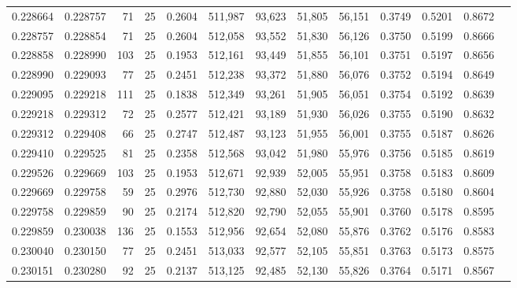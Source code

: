 \begin{tabular}{rrrrrrrrrrrrr}
0.228664 & 0.228757 &    71 &  25 &                                     0.2604 & 511,987 &  93,623 &  51,805 &  56,151 & 0.3749 & 0.5201 & 0.8672 \\
0.228757 & 0.228854 &    71 &  25 &                                     0.2604 & 512,058 &  93,552 &  51,830 &  56,126 & 0.3750 & 0.5199 & 0.8666 \\
0.228858 & 0.228990 &   103 &  25 &                                     0.1953 & 512,161 &  93,449 &  51,855 &  56,101 & 0.3751 & 0.5197 & 0.8656 \\
0.228990 & 0.229093 &    77 &  25 &                                     0.2451 & 512,238 &  93,372 &  51,880 &  56,076 & 0.3752 & 0.5194 & 0.8649 \\
0.229095 & 0.229218 &   111 &  25 &                                     0.1838 & 512,349 &  93,261 &  51,905 &  56,051 & 0.3754 & 0.5192 & 0.8639 \\
0.229218 & 0.229312 &    72 &  25 &                                     0.2577 & 512,421 &  93,189 &  51,930 &  56,026 & 0.3755 & 0.5190 & 0.8632 \\
0.229312 & 0.229408 &    66 &  25 &                                     0.2747 & 512,487 &  93,123 &  51,955 &  56,001 & 0.3755 & 0.5187 & 0.8626 \\
0.229410 & 0.229525 &    81 &  25 &                                     0.2358 & 512,568 &  93,042 &  51,980 &  55,976 & 0.3756 & 0.5185 & 0.8619 \\
0.229526 & 0.229669 &   103 &  25 &                                     0.1953 & 512,671 &  92,939 &  52,005 &  55,951 & 0.3758 & 0.5183 & 0.8609 \\
0.229669 & 0.229758 &    59 &  25 &                                     0.2976 & 512,730 &  92,880 &  52,030 &  55,926 & 0.3758 & 0.5180 & 0.8604 \\
0.229758 & 0.229859 &    90 &  25 &                                     0.2174 & 512,820 &  92,790 &  52,055 &  55,901 & 0.3760 & 0.5178 & 0.8595 \\
0.229859 & 0.230038 &   136 &  25 &                                     0.1553 & 512,956 &  92,654 &  52,080 &  55,876 & 0.3762 & 0.5176 & 0.8583 \\
0.230040 & 0.230150 &    77 &  25 &                                     0.2451 & 513,033 &  92,577 &  52,105 &  55,851 & 0.3763 & 0.5173 & 0.8575 \\
0.230151 & 0.230280 &    92 &  25 &                                     0.2137 & 513,125 &  92,485 &  52,130 &  55,826 & 0.3764 & 0.5171 & 0.8567 \\

\end{tabular}
